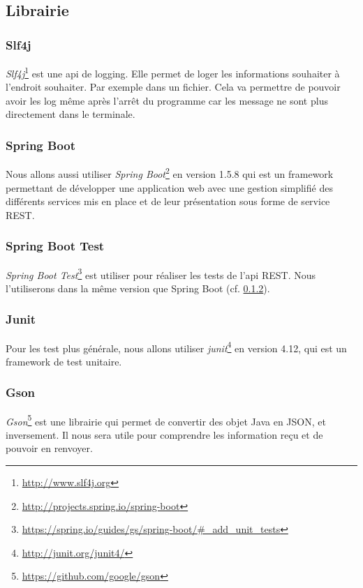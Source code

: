 \documentclass[12pt]{article}
\begin{document}
\subsection{Librairie}

\subsubsection{Slf4j}
\textit{Slf4j}\footnote{\url{http://www.slf4j.org}} est une api de logging. Elle permet de loger les informations souhaiter à l'endroit souhaiter. Par exemple dans un fichier. Cela va permettre de pouvoir avoir les log même après l'arrêt du programme car les message ne sont plus directement dans le terminale.

\subsubsection{Spring Boot} \label{SpringBoot}
Nous allons aussi utiliser \textit{Spring Boot}\footnote{\url{http://projects.spring.io/spring-boot}} en version 1.5.8 qui est un framework permettant de développer une application web avec une gestion simplifié des différents services mis en place et de leur présentation sous forme de service REST.

\subsubsection{Spring Boot Test}
\textit{Spring Boot Test}\footnote{\url{https://spring.io/guides/gs/spring-boot/\#_add_unit_tests}} est utiliser pour réaliser les tests de l'api REST. Nous l'utiliserons dans la même version que Spring Boot (cf. \ref{SpringBoot}).

\subsubsection{Junit}
Pour les test plus générale, nous allons utiliser \textit{junit}\footnote{\url{http://junit.org/junit4/}} en version 4.12, qui est un framework de test unitaire.

\subsubsection{Gson}
\textit{Gson}\footnote{\url{https://github.com/google/gson}} est une librairie qui permet de convertir des objet Java en JSON, et inversement. Il nous sera utile pour comprendre les information reçu et de pouvoir en renvoyer.
\end{document}
